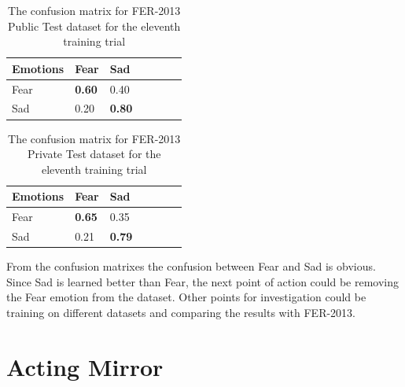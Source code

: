 \documentclass[runningheads,a4paper,11pt]{report}
\begin{document}
\begin{table}[htbp]
	\caption{The confusion matrix for FER-2013 Public Test dataset for the eleventh training trial}
	\label{sad_and_fear_fer_2013_01_mean_square_public_test_confusion_matrix}
		\begin{center}
			\begin{tabular}{p{40pt}p{40pt}p{40pt}p{40pt}p{40pt}p{40pt}c}
				\textbf{Emotions}& \textbf{Fear}& \textbf{Sad} \\
				\hline\hline
				Fear& \textbf{0.60}& 0.40 \\
				Sad& 0.20& \textbf{0.80} \\
				\hline
			\end{tabular}
		\end{center}
\end{table}
\begin{table}[htbp]
	\caption{The confusion matrix for FER-2013 Private Test dataset for the eleventh training trial}
	\label{sad_and_fear_fer_2013_01_mean_square_private_test_confusion_matrix}
		\begin{center}
			\begin{tabular}{p{40pt}p{40pt}p{40pt}p{40pt}p{40pt}p{40pt}c}
				\textbf{Emotions}& \textbf{Fear}& \textbf{Sad} \\
				\hline\hline
				Fear& \textbf{0.65}& 0.35 \\
				Sad& 0.21& \textbf{0.79} \\
				\hline
			\end{tabular}
		\end{center}
\end{table}

From the confusion matrixes the confusion between Fear and Sad is obvious. Since Sad is learned better than Fear, the next point of action could be removing the Fear emotion from the dataset. Other points for investigation could be training on different datasets and comparing the results with FER-2013.



\chapter{Acting Mirror}
\label{chapter:acting_mirror}
\end{document}
